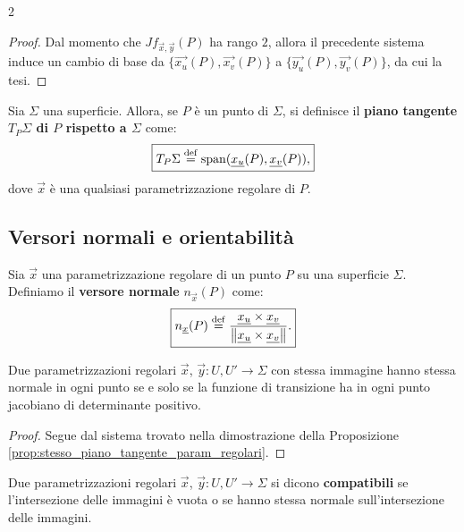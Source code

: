 \begin{multicols*}{2}
\begin{proof}
        Dal momento che $J f_{\vec{x}, \vec{y}}(P)$ ha rango $2$, allora
        il precedente sistema induce un cambio di base da $\{\vec{x_u}(P), \vec{x_v}(P)\}$
        a $\{\vec{y_u}(P), \vec{y_v}(P)\}$, da cui la tesi.
    \end{proof}

    \begin{definition}
        Sia $\Sigma$ una superficie. Allora, se $P$ è un punto di $\Sigma$, si definisce
        il \textbf{piano tangente $T_P \Sigma$ di $P$ rispetto a $\Sigma$} come:
        \[
            \boxed{T_P \Sigma \overset{\mathrm{def}}{=} \operatorname{span}({\underline{x_u}}(P), {\underline{x_v}}(P)),}
        \]
        dove $\vec{x}$ è una qualsiasi parametrizzazione regolare di $P$.
    \end{definition}

    \subsection{Versori normali e orientabilità}

    \begin{definition}
        Sia $\vec{x}$ una parametrizzazione regolare di un punto $P$ su
        una superficie $\Sigma$. Definiamo il \textbf{versore normale}
        $n_\vec{x}(P)$ come:
        \[ \boxed{n_{\underline{x}}(P) \overset{\mathrm{def}}{=} \frac{{\underline{x_u}} \times {\underline{x_v}}}{\left\lVert {\underline{x_u}} \times {\underline{x_v}} \right\rVert}.} \]
    \end{definition}

    \begin{proposition}
        Due parametrizzazioni regolari $\vec{x}$, $\vec{y} : U, U' \to \Sigma$
        con stessa immagine hanno stessa normale in ogni punto se e solo se
        la funzione di transizione ha in ogni punto jacobiano di determinante
        positivo.
    \end{proposition}

    \begin{proof}
        Segue dal sistema trovato nella dimostrazione della Proposizione
        \ref{prop:stesso_piano_tangente_param_regolari}.
    \end{proof}

    \begin{definition}
        Due parametrizzazioni regolari $\vec{x}$, $\vec{y} : U, U' \to \Sigma$
        si dicono \textbf{compatibili} se l'intersezione delle immagini è vuota o
        se hanno stessa normale sull'intersezione delle immagini.
    \end{definition}


\end{multicols*}
